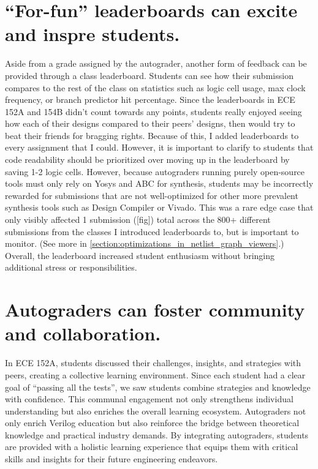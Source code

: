 \section{``For-fun'' leaderboards can excite and inspre students.}
\label{section:leaderboard}

Aside from a grade assigned by the autograder, another form of feedback can be provided through a class leaderboard. Students can see how their submission compares to the rest of the class on statistics such as logic cell usage, max clock frequency, or branch predictor hit percentage. Since the leaderboards in ECE 152A and 154B didn't count towards any points, students really enjoyed seeing how each of their designs compared to their peers' designs, then would try to beat their friends for bragging rights. Because of this, I added leaderboards to every assignment that I could. However, it is important to clarify to students that code readability should be prioritized over moving up in the leaderboard by saving 1-2 logic cells. However, because autograders running purely open-source tools must only rely on Yosys and ABC for synthesis, students may be incorrectly rewarded for submissions that are not well-optimized for other more prevalent synthesis tools such as Design Compiler or Vivado. This was a rare edge case that only visibly affected 1 submission ([fig]) total across the 800+ different submissions from the classes I introduced leaderboards to, but is important to monitor. (See more in \autoref{section:optimizations_in_netlist_graph_viewers}.) Overall, the leaderboard increased student enthusiasm without bringing additional stress or responsibilities.

\section{Autograders can foster community and collaboration.}

In ECE 152A, students discussed their challenges, insights, and strategies with peers, creating a collective learning environment. Since each student had a clear goal of ``passing all the tests'', we saw students combine strategies and knowledge with confidence. This communal engagement not only strengthens individual understanding but also enriches the overall learning ecosystem. Autograders not only enrich Verilog education but also reinforce the bridge between theoretical knowledge and practical industry demands. By integrating autograders, students are provided with a holistic learning experience that equips them with critical skills and insights for their future engineering endeavors.
